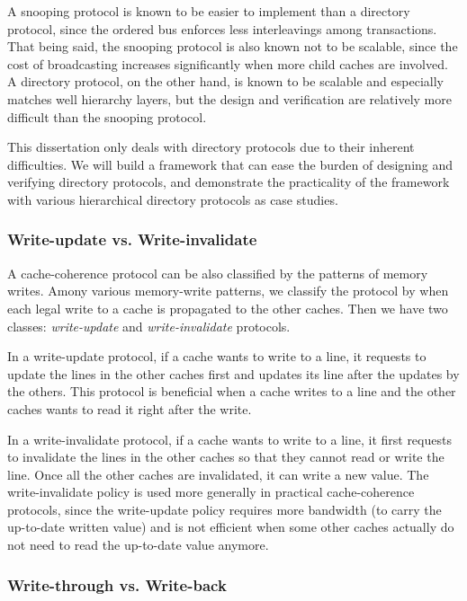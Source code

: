 A snooping protocol is known to be easier to implement than a directory protocol, since the ordered bus enforces less interleavings among transactions.
That being said, the snooping protocol is also known not to be scalable, since the cost of broadcasting increases significantly when more child caches are involved.
A directory protocol, on the other hand, is known to be scalable and especially matches well hierarchy layers, but the design and verification are relatively more difficult than the snooping protocol.

This dissertation only deals with directory protocols due to their inherent difficulties.
We will build a framework that can ease the burden of designing and verifying directory protocols, and demonstrate the practicality of the framework with various hierarchical directory protocols as case studies.

\subsubsection{Write-update vs. Write-invalidate}

A cache-coherence protocol can be also classified by the patterns of memory writes.
Amony various memory-write patterns, we classify the protocol by when each legal write to a cache is propagated to the other caches.
Then we have two classes: \emph{write-update} and \emph{write-invalidate} protocols.

In a write-update protocol, if a cache wants to write to a line, it requests to update the lines in the other caches first and updates its line after the updates by the others.
This protocol is beneficial when a cache writes to a line and the other caches wants to read it right after the write.

In a write-invalidate protocol, if a cache wants to write to a line, it first requests to invalidate the lines in the other caches so that they cannot read or write the line.
Once all the other caches are invalidated, it can write a new value.
The write-invalidate policy is used more generally in practical cache-coherence protocols, since the write-update policy requires more bandwidth (to carry the up-to-date written value) and is not efficient when some other caches actually do not need to read the up-to-date value anymore.

\subsubsection{Write-through vs. Write-back}

